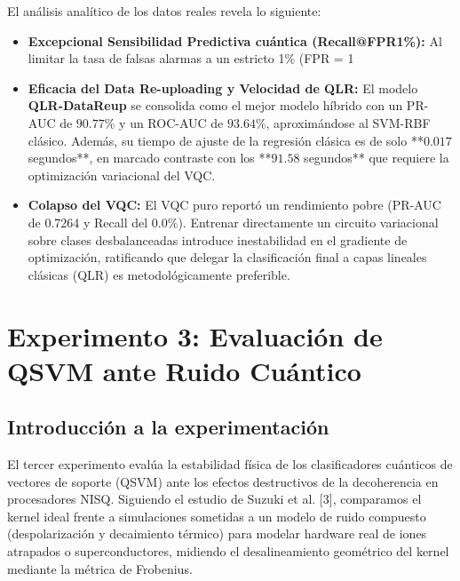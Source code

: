\documentclass[12pt,oneside]{report}
\begin{document}
El análisis analítico de los datos reales revela lo siguiente:
\begin{itemize}
    \item \textbf{Excepcional Sensibilidad Predictiva cuántica (Recall@FPR1\%):} Al limitar la tasa de falsas alarmas a un estricto 1\% (FPR = 1%
    \item \textbf{Eficacia del Data Re-uploading y Velocidad de QLR:} El modelo \textbf{QLR-DataReup} se consolida como el mejor modelo híbrido con un PR-AUC de $90.77\%$ y un ROC-AUC de $93.64\%$, aproximándose al SVM-RBF clásico. Además, su tiempo de ajuste de la regresión clásica es de solo **$0.017$ segundos**, en marcado contraste con los **$91.58$ segundos** que requiere la optimización variacional del VQC.
    \item \textbf{Colapso del VQC:} El VQC puro reportó un rendimiento pobre (PR-AUC de 0.7264 y Recall del $0.0\%$). Entrenar directamente un circuito variacional sobre clases desbalanceadas introduce inestabilidad en el gradiente de optimización, ratificando que delegar la clasificación final a capas lineales clásicas (QLR) es metodológicamente preferible.
\end{itemize}

\section{Experimento 3: Evaluaci\'on de QSVM ante Ruido Cu\'antico}

\subsection{Introducción a la experimentación}
El tercer experimento evalúa la estabilidad física de los clasificadores cuánticos de vectores de soporte (QSVM) ante los efectos destructivos de la decoherencia en procesadores NISQ. Siguiendo el estudio de Suzuki et al. [3], comparamos el kernel ideal frente a simulaciones sometidas a un modelo de ruido compuesto (despolarización y decaimiento térmico) para modelar hardware real de iones atrapados o superconductores, midiendo el desalineamiento geométrico del kernel mediante la métrica de Frobenius.
\end{document}
